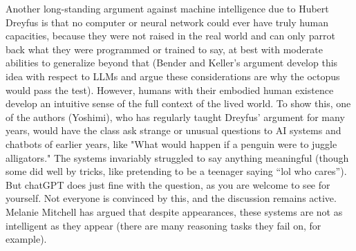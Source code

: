 Another long-standing argument against machine intelligence due to Hubert Dreyfus \cite{dreyfus1992computers} is that no computer or neural network could ever have truly human capacities, because they were not raised in the real world and can only parrot back what they were programmed or trained to say, at best with moderate abilities to generalize beyond that (Bender and Keller's argument develop this idea with respect to LLMs and argue these considerations are why the octopus would pass the test). However, humans with their embodied human existence develop an intuitive sense of the full context of the lived world. To show this, one of the authors (Yoshimi), who has regularly taught Dreyfus'  argument for many years, would have the class ask strange or unusual questions to AI systems and chatbots of earlier years, like "What would happen if a penguin were to juggle alligators." The systems invariably struggled to say anything meaningful (though some did well by tricks, like pretending to be a teenager saying ``lol who cares''). But chatGPT does just fine with the question, as you are welcome to see for yourself. Not everyone is convinced by this, and the discussion remains active. Melanie Mitchell \cite{mitchell2021ai} has argued that despite appearances, these systems are not as intelligent as they appear (there are many reasoning tasks they fail on, for example).


